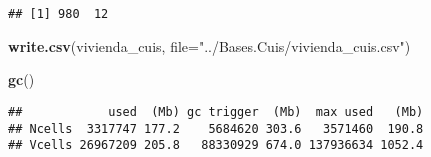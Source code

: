 \documentclass[11pt,]{article}
\newenvironment{Shaded}{\begin{snugshade}}{\end{snugshade}}
\newcommand{\KeywordTok}[1]{\textcolor[rgb]{0.13,0.29,0.53}{\textbf{#1}}}
\newcommand{\DataTypeTok}[1]{\textcolor[rgb]{0.13,0.29,0.53}{#1}}
\newcommand{\StringTok}[1]{\textcolor[rgb]{0.31,0.60,0.02}{#1}}
\newcommand{\NormalTok}[1]{#1}
\begin{document}
\begin{verbatim}
## [1] 980  12
\end{verbatim}

\begin{Shaded}
\begin{Highlighting}[]
\KeywordTok{write.csv}\NormalTok{(vivienda_cuis, }\DataTypeTok{file=}\StringTok{"../Bases.Cuis/vivienda_cuis.csv"}\NormalTok{)}

\KeywordTok{gc}\NormalTok{()}
\end{Highlighting}
\end{Shaded}

\begin{verbatim}
##            used  (Mb) gc trigger  (Mb)  max used   (Mb)
## Ncells  3317747 177.2    5684620 303.6   3571460  190.8
## Vcells 26967209 205.8   88330929 674.0 137936634 1052.4
\end{verbatim}




\newpage
\singlespacing 
\end{document}
